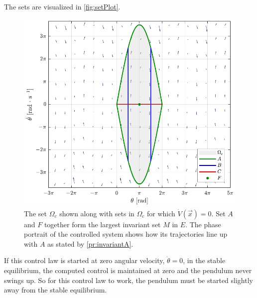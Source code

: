 %
The sets are visualized in \autoref{fig:setPlot}.
\begin{figure}[H]
  \includegraphics[width=.65\textwidth]{figures/setPlot}
  \caption{The set $\Omega_c$ shown along with sets in $\Omega_c$ for which $\dot{V}(\vec{x}) = 0$. Set $A$ and $F$ together form the largest invariant set $M$ in $E$. The phase portrait of the controlled system shows how its trajectories line up with $A$ as stated by \autoref{pr:invariantA}.}
  \label{fig:setPlot}
\end{figure}
%
If this control law is started at zero angular velocity, $\dot{\theta} = 0$, in the stable equilibrium, the computed control is maintained at zero and the pendulum never swings up. So for this control law to work, the pendulum must be started slightly away from the stable equilibrium.

